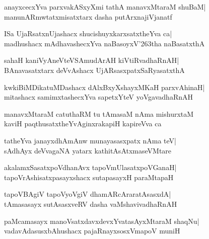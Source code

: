 \documentclass[twoside,12pt,openright]{book}
\def\S{\char'263}
\newcounter{shloka}[chapter]
\begin{document}
\begin{shloka}%
anayxcecxYva parxvakASxyXmi tathA manavxMtaraM shuBaM|\\
manunARmwtatxmisatxtarx dasha putArxnajiVjanatf
\end{shloka}

\begin{shloka}%
ISa UjaRsatxnUjashacx shucishuyxkarxsatxtheYva ca|\\
madhushacx mAdhavashecxYva naBasoyxV\S tha naBasatxthA
\end{shloka}

\begin{shloka}%
sahaH kaniVyAneVteVSAmudArAH kiVtiRvadhaRnAH|\\
BAnavasatxtarx deVvAshacx UjARsasxpatxSaRyasatxthA
\end{shloka}

\begin{shloka}%
kwkiBiMDikatuMDashacx dAlxBxyXshayxMKaH parxvAhinaH|\\
mitashacx samimxtashecxYva sapetxYteV yoVgavadhaRnAH
\end{shloka}

\begin{shloka}%
manavxMtaraM catuthaRM tu tAmasaM nAma mishurxtaM\\
kaviH paqthusatxtheYvAginxrakapiH kapireVva ca
\end{shloka}

\begin{shloka}%
tatheYva janayxdhAmAnw munayasasxpatx nAma teV|\\
sAdhAyx deVvagaNA yatarx kathitAsAtxmaseVMtare
\end{shloka}

\begin{shloka}%
akalamxSasatxpoVdhanAvx tapoVmUlasatxpoVGanaH|\\
tapoVrAshisatxpasayxshacx sutapasayxH paraMtapaH
\end{shloka}

\begin{shloka}%
tapoVBAgiV tapoVyoVgiV dhamARcAraratAsasxdA|\\
tAmasasayx sutAsasxveRV dasha vaMshavivadhaRnAH
\end{shloka}

\begin{shloka}%
paMcamasayx manoVsatxdavxdevxYvatasAyxMtaraM shaqNu|\\
vadavAdasusxbAhushacx pajaRnayxsosxVmapoV muniH
\end{shloka}
\end{document}
